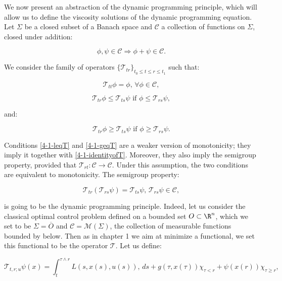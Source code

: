 We now present an abstraction of the dynamic programming principle, which will allow us to define the viscosity solutions of the dynamic programming 
equation. Let $\Sigma$ be a closed subset of a Banach space and $\mathcal{C}$ a collection of functions on $\Sigma$, closed under addition:

\[\phi,\psi\in\mathcal{C}\Rightarrow \phi+\psi\in\mathcal{C}.\]

We consider the family of operators $\{\mathcal{T}_{tr}\}_{t_0\leq t\leq r\leq t_1}$ such that: 

\begin{equation}\label{4-1-identityofT}
    \mathcal{T}_{tt}\phi = \phi,\, \forall\phi\in\mathcal{C},
\end{equation}

\begin{equation}\label{4-1-leqT}
    \mathcal{T}_{tr}\phi\leq\mathcal{T}_{ts}\psi \text{ if } \phi\leq \mathcal{T}_{rs}\psi,
\end{equation}

and:

\begin{equation}\label{4-1-geqT}
    \mathcal{T}_{tr}\phi\geq\mathcal{T}_{ts}\psi \text{ if } \phi\geq \mathcal{T}_{rs}\psi.
\end{equation}

Conditions \ref{4-1-leqT} and \ref{4-1-geqT} are a weaker version of monotonicity; they imply it together with \ref{4-1-identityofT}. 
Moreover, they also imply the semigroup property, provided that $\mathcal{T}_{rt}:\mathcal{C}\rightarrow\mathcal{C}$. Under this assumption,
the two conditions are equivalent to monotonicity. The semigroup property:

\begin{equation}
    \mathcal{T}_{tr}\left(\mathcal{T}_{rs}\psi\right)=\mathcal{T}_{ts}\psi,\,\mathcal{T}_{rs}\psi\in\mathcal{C},
\end{equation}

is going to be the dynamic programming principle. Indeed, let us consider the classical optimal control problem defined on a bounded set 
$O\subset\R^n$, which we set to be $\Sigma=\overline{O}$ and $\mathcal{C}=\mathcal{M}(\Sigma)$, the collection of measurable functions bounded by below. Then as in chapter 1 we aim at minimize a functional, 
we set this functional to be the operator $\mathcal{T}$. Let us define:

\begin{equation}\label{4-1-valuefunctreform}
    \mathcal{T}_{t,r;u}\psi(x) = \int_t^{\tau\wedge r}L(s,x(s),u(s)),\,ds + g(\tau,x(\tau))\chi_{\tau<r} + \psi(x(r))\chi_{\tau\geq r}, 
\end{equation}

